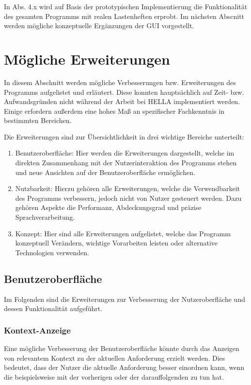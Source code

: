 \documentclass[12pt]{report}
\begin{document}
In Abs. 4.x wird auf Basis der prototypischen Implementierung die Funktionalität des gesamten Programms mit realen Lastenheften erprobt. Im nächsten Abscnitt werden mögliche konzeptuelle Ergänzungen der GUI vorgestellt. 

\section{Mögliche Erweiterungen}
In diesem Abschnitt werden mögliche Verbesserungen bzw. Erweiterungen des Programms aufgelistet und erläutert. Diese konnten hauptsächlich auf Zeit- bzw. Aufwandsgründen nicht während der Arbeit bei HELLA implementiert werden. Einige erfordern außerdem eine hohes Maß an spezifischer Fachkenntnis in bestimmten Bereichen. 

Die Erweiterungen sind zur Übersichtlichkeit in drei wichtige Bereiche unterteilt:
\begin{enumerate}
\item Benutzeroberfläche: Hier werden die Erweiterungen dargestellt, welche im direkten Zusammenhang mit der Nutzerinteraktion des Programms stehen und neue Ansichten auf der Benutzeroberfläche ermöglichen. 
\item Nutzbarkeit: Hierzu gehören alle Erweiterungen, welche die Verwendbarkeit des Programms verbessern, jedoch nicht von Nutzer gesteuert werden. Dazu gehören Aspekte die Performanz, Abdeckungsgrad und präzise Sprachverarbeitung.
\item Konzept: Hier sind alle Erweiterungen aufgelistet, welche das Programm konzeptuell Verändern, wichtige Vorarbeiten leisten oder alternative Technologien verwenden.  
\end{enumerate}

\subsection{Benutzeroberfläche}
Im Folgenden sind die Erweiterungen zur Verbesserung der Nutzeroberfläche und dessen Funktionalität aufgeführt. 

\subsubsection{Kontext-Anzeige}
Eine mögliche Verbesserung der Benutzeroberfläche könnte durch das Anzeigen von relevantem Kontext zu der aktuellen Anforderung erzielt werden. Dies bedeutet, dass der Nutzer die aktuelle Anforderung besser einordnen kann, wenn die beispielsweise mit der vorherigen oder der darauffolgenden zu tun hat. 
\end{document}
